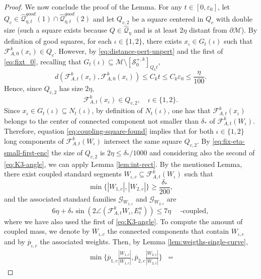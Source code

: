 \documentclass{amsart}
\numberwithin{equation}{section}
\newcommand\ve{\varepsilon}
\renewcommand{\ge}{\geqslant}
\renewcommand{\le}{\leqslant}
\newcommand\cF{{\mathcal F}}
\newcommand\cG{{\mathcal G}}
\newcommand\cM{{\mathcal M}}
\newcommand\cQ{{\mathcal Q}}
\newcommand\cS{{\mathcal S}}
\newcommand{\catt}{\cF_{A,t}}
\newcommand{\cato}{\cF_{A,0}}
\begin{document}
\begin{proof}
We now conclude the proof of the Lemma. For any \(t \in [0,\ve_0]\), let \(Q_c \in \widehat \cQ_{\eta,t}^{good}(1) \cap \widehat \cQ_{\eta,t}^{good}(2)\) and let \(Q_{c,2}\) be a square centered in \(Q_c\) with double size (such a square exists because \(Q \in \widehat\cQ_{\eta}\) and is at least \(2\eta\) distant from \(\partial \cM\)). By definition of good squares, for each \(\iota \in \{1,2\}\), there exists \(x_{\iota} \in G_t(\iota)\) such that \(\cato^k(x_{\iota}) \in Q_c\). However, by \eqref{eq:distance-pert-unpert} and the first of \eqref{eq:fixt_0}, recalling that \(G_t(\iota)  \subseteq \cM\setminus [\cS_0^{+,k}]_{Q_k t}\),
\[
 d\left(\catt^k(x_{\iota}), \cato^k(x_{\iota}) \right) \le C_k t \le  C_k \ve_0 \le \frac{\eta}{100}.
\]
Hence, since \(Q_{c,2}\) has size \(2\eta\), 
\begin{equation}\label{eq:coupling-square-found}
  \catt^k(x_{\iota}) \in Q_{c,2}, \quad \iota \in \{1,2\}.
\end{equation}
Since \(x_{\iota} \in  G_t(\iota) \subseteq N_{t}(\iota) \), by definition of \(N_t(\iota)\), one has that \(\catt^k(x_{\iota})\) belongs to the center of connected component not smaller than \(\delta_{*}\) of \(\catt^k \left( W_\iota \right)\). Therefore, equation \eqref{eq:coupling-square-found} implies that for both \(\iota \in \{1,2\}\) long components of \(\catt^k \left( W_\iota \right)\) intersect the same square \(Q_{c,2}\). By \eqref{eq:fix-eta-small-first-enc} the size of \(Q_{c,2}\) is \(2\eta \le \delta_{*}/1000\) and considering also the second of \eqref{eq:K3-angle}, we can apply Lemma \ref{lem:int-rect}. By the mentioned Lemma, there exist coupled standard segments \(W_{\iota,c} \subseteq \catt^{k}(W_{\iota}) \) such that 
\begin{equation}\label{eq:lowe-length-seg}
 \min\{|W_{1,c}|, |W_{2,c}| \}\ge \frac{\delta_{*}}{200},
\end{equation}
and the associated standard families \(\cG_{W_{1,c}}\) and \(\cG_{W_{2,c}}\)  are 
\[
6\eta + \delta_{*}\sin\left (2\angle(\catt^{k}W_\iota, E_t^u) \right) \le 7\eta \text{ }\text{ }\text{-coupled},
\]
where we have also used the first of \eqref{eq:K3-angle}. To compute the amount of coupled mass, we denote by \(\overline W_{\iota,c}\) the connected components that contain \(W_{\iota,c}\) and by \(\overline p_{\iota,c}\) the associated weights. Then, by Lemma \ref{lem:weigths-single-curve},
\[
\begin{split}
\min \biggl\{\overline p_{1,c}\frac{|W_{1,c}|}{|\overline W_{1,c}|}, \overline p_{2,c}\frac{|W_{2,c}|}{|\overline W_{2,c}|}\biggr\} &=

\end{split}\]
\end{proof}
\end{document}
